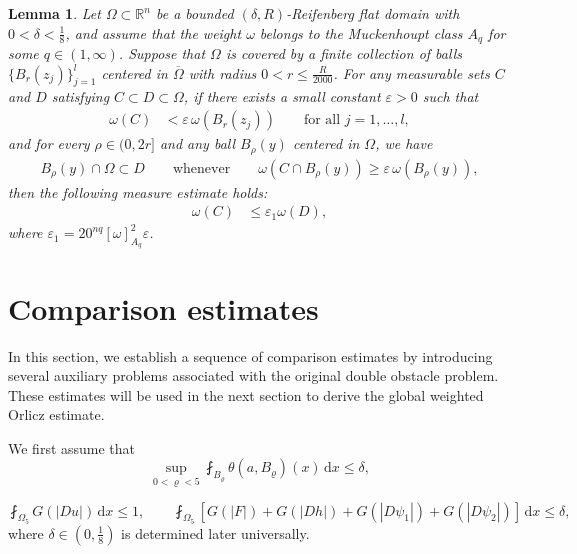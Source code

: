 \documentclass[10pt,a4paper]{article}
\newtheorem{lemma}[theorem]{Lemma}
\theoremstyle{definition}
\numberwithin{equation}{section}
\begin{document}
 \begin{lemma}\label{weight5}
 Let $\Omega \subset \mathbb{R}^n$ be a bounded $(\delta,R)$-Reifenberg flat domain with $0 < \delta < \frac{1}{8}$, and assume that the weight $\omega$ belongs to the Muckenhoupt class $A_q$ for some $q \in (1, \infty)$. Suppose that $\Omega$ is covered by a finite collection of balls $\{B_r(z_j)\}_{j=1}^{l}$ centered in $\overline{\Omega}$ with radius $0 < r \leq \frac{R}{2000}$. For any measurable sets $C$ and $D$ satisfying $C \subset D \subset \Omega$, if there exists a small constant $\varepsilon > 0$ such that
 \begin{align*}
 	\omega(C) &< \varepsilon \, \omega(B_r(z_j)) \qquad \text{for all } j=1,\ldots,l,
 \end{align*}
 and for every $\rho \in (0, 2r]$ and any ball $B_\rho(y)$ centered in $\Omega$, we have
 \begin{align*}
 	B_\rho(y) \cap \Omega \subset D \qquad \text{whenever} \qquad \omega(C \cap B_\rho(y)) \geq \varepsilon \, \omega(B_\rho(y)),
 \end{align*}
 then the following measure estimate holds:
 \begin{align*}
 	\omega(C) &\leq \varepsilon_1 \omega(D),
 \end{align*}
 where $\varepsilon_1 = 20^{nq}[\omega]_{A_q}^2 \varepsilon$.
 \end{lemma}

 
  \section{Comparison estimates}
 In this section, we establish a sequence of comparison estimates by introducing several auxiliary problems associated with the original double obstacle problem. These estimates will be used in the next section to derive the global weighted Orlicz estimate.
 
We first assume that
\begin{equation}\label{ass1}
  \sup_{0<\varrho<5} \fint_{B_\varrho} \theta(a, B_\varrho)(x) \, \mathrm{d}x \leq \delta,
\end{equation}

\begin{equation}\label{ass2}
\fint_{\Omega_5} G(|Du|) \, \mathrm{d}x \leq 1, \qquad \fint_{\Omega_5}\left[  G(|F|)+G(|Dh|)+G(|D\psi_1|)+G(|D\psi_2|)\right]  \, \mathrm{d}x \leq \delta,
\end{equation}
where $\delta \in (0, \frac{1}{8})$ is determined later universally. 
\end{document}
